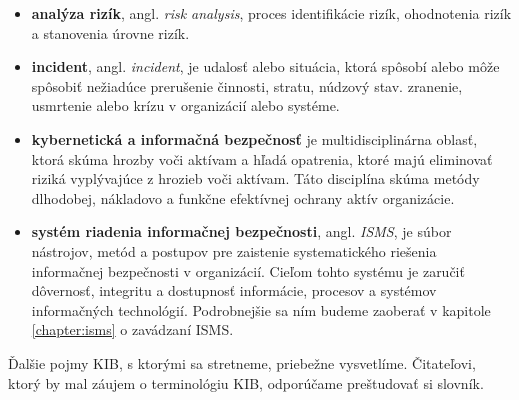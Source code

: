 \begin{itemize}
  \item \textbf{analýza rizík}, angl. \textit{risk analysis}, proces identifikácie rizík, ohodnotenia rizík a stanovenia
    úrovne rizík.
  \item \textbf{incident}, angl. \textit{incident}, je udalosť alebo situácia, ktorá spôsobí alebo môže spôsobiť nežiadúce
    prerušenie činnosti, stratu, núdzový stav. zranenie, usmrtenie alebo krízu v organizácií alebo systéme.

  \item \textbf{kybernetická a informačná bezpečnosť} je multidisciplinárna oblasť, ktorá skúma hrozby voči aktívam a
    hľadá opatrenia, ktoré majú eliminovať riziká vyplývajúce z hrozieb voči aktívam. Táto disciplína skúma metódy
    dlhodobej, nákladovo a funkčne efektívnej ochrany aktív organizácie.

  \item \textbf{systém riadenia informačnej bezpečnosti}, angl. \textit{\acrfull{ISMS}}, je súbor nástrojov, metód a postupov pre zaistenie
    systematického riešenia informačnej bezpečnosti v organizácií. Cieľom tohto systému je zaručiť dôvernosť, integritu a dostupnosť
    informácie, procesov a systémov informačných technológií. Podrobnejšie sa ním budeme zaoberať v kapitole \ref{chapter:isms}
    o zavádzaní ISMS.

\end{itemize}

Ďalšie pojmy KIB, s ktorými sa stretneme, priebežne vysvetlíme. Čitateľovi, ktorý by mal záujem o terminológiu KIB, odporúčame
preštudovať si slovník\cite{KUDIKB-MVS}.
